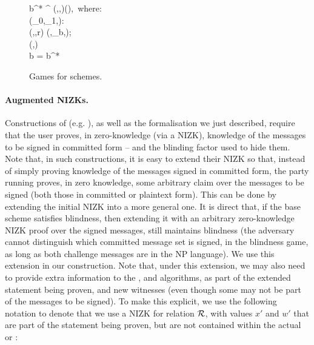 \begin{figure}[ht!]
{\begin{minipage}[t]{0.43\textwidth}
{        %
        b^* \gets \adv^{
          (\cdot,\cdot,\cdot)}(\vk),~\textrm{where:} \\
        \pcind {}(\osmsg_0,\osmsg_1,\smsg): \\
        \pcind \pcind (\com,\pi,r) \gets \Blind(\vk,\osmsg_b,\smsg); \\
        \pcind \pcind \pcreturn (\com,\pi) \\
        \pcreturn b = b^*
      }
    \end{minipage}
  }
  \label{fig:sbcm-games}
  \caption{Games for \SBCM schemes.}
\end{figure}

\paragraph{Augmented NIZKs.} %
Constructions of \SBCM (e.g. \cite{asm06}), as well as the formalisation we just
described, require that the user proves, in zero-knowledge (via a NIZK),
knowledge of the messages to be signed in committed
form -- and the blinding factor used to hide them. Note that, in such
constructions, it is easy to extend their NIZK so that, instead of simply
proving knowledge of the messages signed in committed form, the party running
\SBCMBlind proves, in zero knowledge, some arbitrary claim over the messages to
be signed (both those in committed or plaintext form). This can be done by
extending the initial NIZK into a more general one. 
%
It is direct that, if the base \SBCM scheme satisfies blindness, then extending
it with an arbitrary zero-knowledge NIZK proof over the signed messages, still
maintains blindness (the adversary cannot distinguish which committed message
set is signed, in the blindness game, as long as both challenge messages are
in the NP language).
%
We use this extension in our \CUASGen construction. Note that, under this
extension, we may also need to provide extra information to the \SBCMBlind,
\SBCMSign and \SBCMUnblind algorithms, as part of the extended statement being
proven, and new witnesses (even though some may not be part of the messages to
be signed). To make this explicit, we use the following notation to denote
that we use a NIZK for relation $\mathcal{R}$, with values $x'$ and $w'$ that are
part of the statement being proven, but are not contained within the actual
\smsg or \osmsg:

